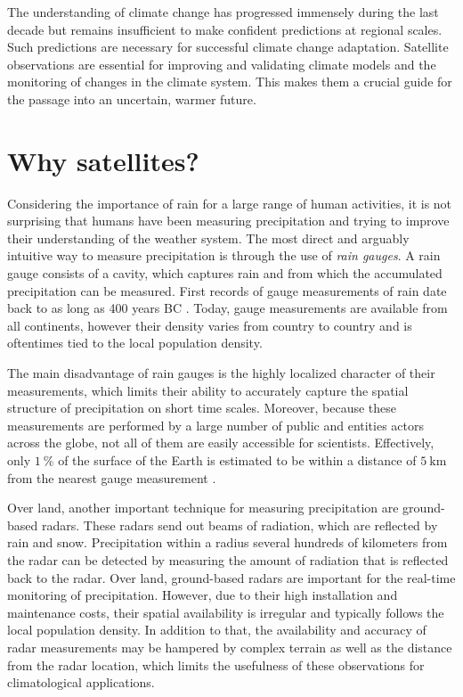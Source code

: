 The understanding of climate change has progressed immensely during the last
decade but remains insufficient to make confident predictions at regional
scales. Such predictions are necessary for successful climate change adaptation.
Satellite observations are essential for improving and validating climate models
and the monitoring of changes in the climate system. This makes them a crucial
guide for the passage into an uncertain, warmer future.

\section{Why satellites?}

Considering the importance of rain for a large range of human activities, it is
not surprising that humans have been measuring precipitation and trying to
improve their understanding of the weather system. The most direct and arguably
intuitive way to measure precipitation is through the use of \textit{rain
gauges}. A rain gauge consists of a cavity, which captures rain and from which
the accumulated precipitation can be measured. First records of gauge
measurements of rain date back to as long as 400 years
BC \citep{strangeways2000}. Today, gauge measurements are available from all
continents, however their density varies from country to country and is
oftentimes tied to the local population density.

The main disadvantage of rain gauges is the highly localized character of their
measurements, which limits their ability to accurately capture the spatial
structure of precipitation on short time scales. Moreover, because these
measurements are performed by a large number of public and entities actors across
the globe, not all of them are easily accessible for scientists. Effectively,
only $\SI{1}{\percent}$ of the surface of the Earth is estimated to be within a
distance of $\SI{5}{\kilo \meter}$ from the nearest gauge
measurement \citep{kidd17}.

Over land, another important technique for measuring precipitation are
ground-based radars. These radars send out beams of radiation, which are
reflected by rain and snow. Precipitation within a radius several hundreds of
kilometers from the radar can be detected by measuring the amount of radiation
that is reflected back to the radar. Over land, ground-based radars are
important for the real-time monitoring of precipitation. However, due to their
high installation and maintenance costs, their spatial availability is irregular
and typically follows the local population density. In addition to that, the
availability and accuracy of radar measurements may be hampered by complex
terrain as well as the distance from the radar location, which limits the
usefulness of these observations for climatological applications.

